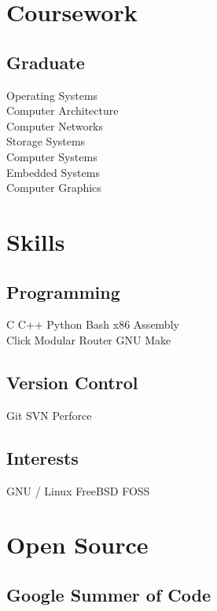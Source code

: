 \documentclass[]{deedy-resume-openfont}
\begin{document}
\begin{minipage}[t]{0.33\textwidth}

\section{Coursework}
\subsection{Graduate}
Operating Systems \\
Computer Architecture \\
Computer Networks \\
Storage Systems \\
Computer Systems \\
Embedded Systems \\
Computer Graphics \\

\sectionsep %

\section{Skills}
\subsection{Programming}
C \textbullet{} C++ \textbullet{} Python \textbullet{} Bash \textbullet{} x86 Assembly \\
Click Modular Router  \textbullet{} GNU Make \\
\sectionsep %
\subsection{Version Control}
Git \textbullet{} SVN \textbullet{} Perforce
\sectionsep %
\subsection{Interests}
GNU / Linux \textbullet{} FreeBSD \textbullet{} FOSS
\sectionsep %
\section{Open Source}
\subsection{Google Summer of Code}
%
%

\end{minipage} 
\end{document}
